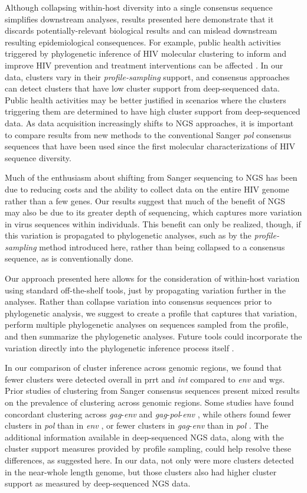 \documentclass[letterpaper]{article}
\begin{document}
Although collapsing within-host diversity into a single consensus sequence simplifies downstream analyses, results presented here demonstrate that it discards potentially-relevant biological results and can mislead downstream resulting epidemiological consequences. For example, public health activities triggered by phylogenetic inference of HIV molecular clustering to inform and improve HIV prevention and treatment interventions can be affected \parencite{peters}. In our data, clusters vary in their \emph{profile-sampling} support, and consensus approaches can detect clusters that have low cluster support from deep-sequenced data. Public health activities may be better justified in scenarios where the clusters triggering them are determined to have high cluster support from deep-sequenced data. As data acquisition increasingly shifts to NGS approaches, it is important to compare results from new methods to the conventional Sanger \emph{pol} consensus sequences that have been used since the first molecular characterizations of HIV sequence diversity.

Much of the enthusiasm about shifting from Sanger sequencing to NGS has been due to reducing costs and the ability to collect data on the entire HIV genome rather than a few genes. Our results suggest that much of the benefit of NGS may also be due to its greater depth of sequencing, which captures more variation in virus sequences within individuals. This benefit can only be realized, though, if this variation is propagated to phylogenetic analyses, such as by the \emph{profile-sampling} method introduced here, rather than being collapsed to a consensus sequence, as is conventionally done.

Our approach presented here allows for the consideration of within-host variation using standard off-the-shelf tools, just by propagating variation further in the analyses. Rather than collapse variation into consensus sequences prior to phylogenetic analysis, we suggest to create a profile that captures that variation, perform multiple phylogenetic analyses on sequences sampled from the profile, and then summarize the phylogenetic analyses. Future tools could incorporate the variation directly into the phylogenetic inference process itself \cite{guang}.

In our comparison of cluster inference across genomic regions, we found that fewer clusters were detected overall in prrt and \emph{int} compared to \emph{env} and wgs. Prior studies of clustering from Sanger consensus sequences present mixed results on the prevalence of clustering across genomic regions. Some studies have found concordant clustering across \emph{gag}-\emph{env} \parencite{han} and \emph{gag}-\emph{pol}-\emph{env} \parencite{english,kaye}, while others found fewer clusters in \emph{pol} than in \emph{env} \parencite{kapaata}, or fewer clusters in \emph{gag}-\emph{env} than in \emph{pol} \parencite{ndiaye}. The additional information available in deep-sequenced NGS data, along with the cluster support measures provided by profile sampling, could help resolve these differences, as suggested here. In our data, not only were more clusters detected in the near-whole length genome, but those clusters also had higher cluster support as measured by deep-sequenced NGS data.
\end{document}
